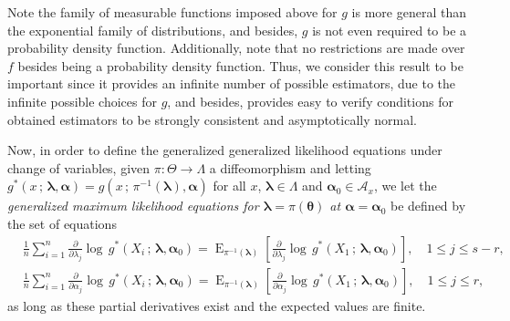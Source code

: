 \documentclass[12pt]{article} %
\newcommand{\bs}{\boldsymbol}
\newcommand{\on}{\operatorname}
\theoremstyle{definition}
\begin{document}
Note the family of measurable functions imposed above for $g$ is more general than the exponential family of distributions, and besides, $g$ is not even required to be a probability density function.
 Additionally, note that no restrictions are made over $f$ besides being a probability density function. Thus, we consider this result to be important since it provides an infinite number of possible estimators, due to the infinite possible choices for $g$, and besides, provides easy to verify conditions for obtained estimators to be strongly consistent and asymptotically normal.

Now, in order to define the generalized generalized likelihood equations under change of variables, given $\pi:\Theta\to \Lambda$ a diffeomorphism and letting $g^*(x\,;\, \bs{\lambda},\bs{\alpha})=g(x\,;\, \pi^{-1}(\bs{\lambda}),\bs{\alpha})$ for all $x$, $\bs{\lambda}\in \Lambda$ and $\bs{\alpha}_0\in \mathcal{A}_x$, we let the \textit{generalized maximum likelihood equations for $\bs{\lambda}=\pi(\bs{\theta})$ at $\bs{\alpha}=\bs{\alpha}_0$} be defined by the set of equations
\begin{equation}\label{modified2}
\begin{aligned}
&\frac{1}{n}\sum_{i=1}^n \frac{\partial}{\partial \lambda_j}  \log\, g^*(X_i\,;\,\bs{\lambda},\bs{\alpha}_0) = \on{E}_{\pi^{-1}(\bs{\lambda})}\left[\frac{\partial}{\partial \lambda_j}  \log\, g^*(X_1\,;\,\bs{\lambda},\bs{\alpha}_0)\right],\quad 1\leq j\leq s-r,\\ &\frac{1}{n}
\sum_{i=1}^n \frac{\partial}{\partial \alpha_j}  \log\, g^*(X_i\,;\,\bs{\lambda},\bs{\alpha}_0)=\on{E}_{\pi^{-1}(\bs{\lambda})}\left[\frac{\partial}{\partial \alpha_j}  \log\, g^*(X_1\,;\,\bs{\lambda},\bs{\alpha}_0)\right], \quad  1\leq j\leq r,
\end{aligned}
\end{equation}
as long as these partial derivatives exist and the expected values are finite.
\end{document}
